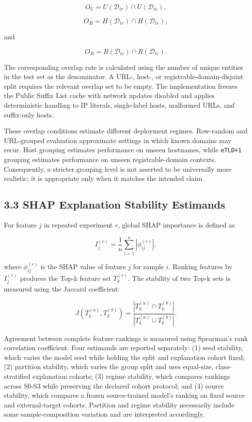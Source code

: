 \documentclass[
  10pt,
]{article}
\begin{document}
\[
O_U=U(\mathcal{D}_{tr})\cap U(\mathcal{D}_{te}),
\]

\[
O_H=H(\mathcal{D}_{tr})\cap H(\mathcal{D}_{te}),
\]

and

\[
O_R=R(\mathcal{D}_{tr})\cap R(\mathcal{D}_{te}).
\]

The corresponding overlap rate is calculated using the number of unique
entities in the test set as the denominator. A URL-, host-, or
registrable-domain-disjoint split requires the relevant overlap set to
be empty. The implementation freezes the Public Suffix List cache with
network updates disabled and applies deterministic handling to IP
literals, single-label hosts, malformed URLs, and suffix-only hosts.

These overlap conditions estimate different deployment regimes.
Row-random and URL-grouped evaluation approximate settings in which
known domains may recur. Host grouping estimates performance on unseen
hostnames, while \texttt{eTLD+1} grouping estimates performance on
unseen registrable-domain contexts. Consequently, a stricter grouping
level is not asserted to be universally more realistic; it is
appropriate only when it matches the intended claim.

\subsection{3.3 SHAP Explanation Stability
Estimands}\label{shap-explanation-stability-estimands}

For feature \(j\) in repeated experiment \(r\), global SHAP importance
is defined as

\[
I_j^{(r)}=\frac{1}{n}\sum_{i=1}^{n}|\phi_{ij}^{(r)}|,
\]

where \(\phi_{ij}^{(r)}\) is the SHAP value of feature \(j\) for sample
\(i\). Ranking features by \(I_j^{(r)}\) produces the Top-k feature set
\(T_k^{(r)}\). The stability of two Top-k sets is measured using the
Jaccard coefficient:

\[
J(T_k^{(a)},T_k^{(b)})=\frac{|T_k^{(a)}\cap T_k^{(b)}|}{|T_k^{(a)}\cup T_k^{(b)}|}.
\]

Agreement between complete feature rankings is measured using Spearman's
rank correlation coefficient. Four estimands are reported separately:
(1) seed stability, which varies the model seed while holding the split
and explanation cohort fixed; (2) partition stability, which varies the
group split and uses equal-size, class-stratified explanation cohorts;
(3) regime stability, which compares rankings across S0-S3 while
preserving the declared cohort protocol; and (4) source stability, which
compares a frozen source-trained model's ranking on fixed source and
external-target cohorts. Partition and regime stability necessarily
include some sample-composition variation and are interpreted
accordingly.
\end{document}
